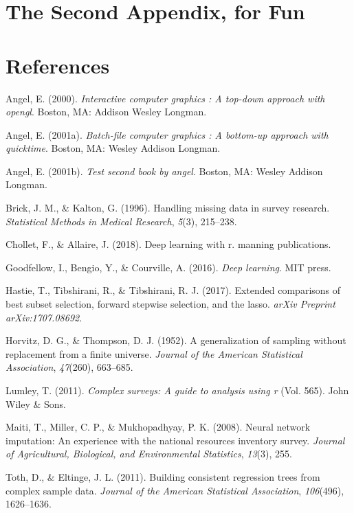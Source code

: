 \documentclass[12pt,twoside]{reedthesis}
\begin{document}
\chapter{The Second Appendix, for
Fun}\label{the-second-appendix-for-fun}

\backmatter

\chapter*{References}\label{references}


\noindent

\setlength{\parindent}{-0.20in} \setlength{\leftskip}{0.20in}
\setlength{\parskip}{8pt}

\hypertarget{refs}{}
\hypertarget{ref-angel2000}{}
Angel, E. (2000). \emph{Interactive computer graphics : A top-down
approach with opengl}. Boston, MA: Addison Wesley Longman.

\hypertarget{ref-angel2001}{}
Angel, E. (2001a). \emph{Batch-file computer graphics : A bottom-up
approach with quicktime}. Boston, MA: Wesley Addison Longman.

\hypertarget{ref-angel2002a}{}
Angel, E. (2001b). \emph{Test second book by angel}. Boston, MA: Wesley
Addison Longman.

\hypertarget{ref-brick1996handling}{}
Brick, J. M., \& Kalton, G. (1996). Handling missing data in survey
research. \emph{Statistical Methods in Medical Research}, \emph{5}(3),
215--238.

\hypertarget{ref-chollet2018deep}{}
Chollet, F., \& Allaire, J. (2018). Deep learning with r. manning
publications.

\hypertarget{ref-goodfellow2016deep}{}
Goodfellow, I., Bengio, Y., \& Courville, A. (2016). \emph{Deep
learning}. MIT press.

\hypertarget{ref-hastie2017extended}{}
Hastie, T., Tibshirani, R., \& Tibshirani, R. J. (2017). Extended
comparisons of best subset selection, forward stepwise selection, and
the lasso. \emph{arXiv Preprint arXiv:1707.08692}.

\hypertarget{ref-horvitz1952generalization}{}
Horvitz, D. G., \& Thompson, D. J. (1952). A generalization of sampling
without replacement from a finite universe. \emph{Journal of the
American Statistical Association}, \emph{47}(260), 663--685.

\hypertarget{ref-lumley2011complex}{}
Lumley, T. (2011). \emph{Complex surveys: A guide to analysis using r}
(Vol. 565). John Wiley \& Sons.

\hypertarget{ref-maiti2008neural}{}
Maiti, T., Miller, C. P., \& Mukhopadhyay, P. K. (2008). Neural network
imputation: An experience with the national resources inventory survey.
\emph{Journal of Agricultural, Biological, and Environmental
Statistics}, \emph{13}(3), 255.

\hypertarget{ref-toth2011building}{}
Toth, D., \& Eltinge, J. L. (2011). Building consistent regression trees
from complex sample data. \emph{Journal of the American Statistical
Association}, \emph{106}(496), 1626--1636.


\end{document}
